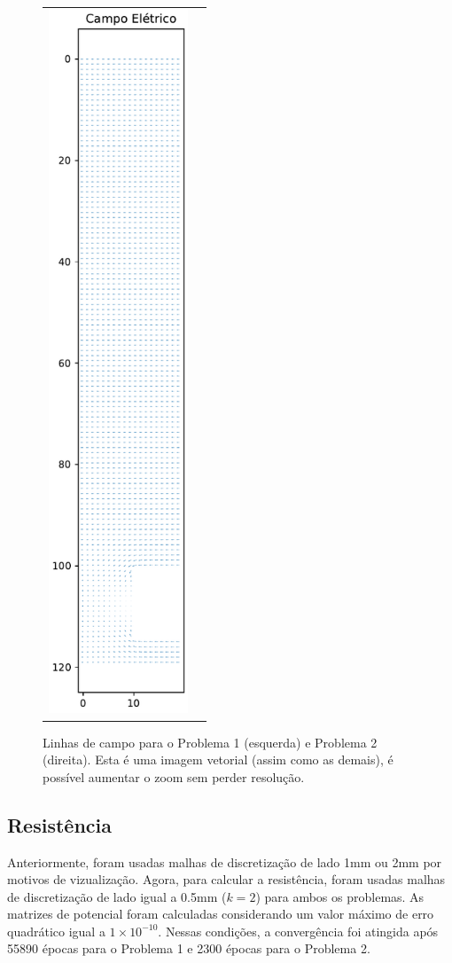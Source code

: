 \documentclass{aleph-revista}
\begin{document}
\begin{figure}[!ht]
\begin{tabular}{cc}
    \includegraphics[height=210mm]{p2_campo_eletrico}
  \end{tabular}
  \caption{Linhas de campo para o Problema 1 (esquerda) e Problema 2 (direita). Esta é uma imagem vetorial (assim como as demais), é possível aumentar o zoom sem perder resolução.}
  \label{fig:campo}
\end{figure}


\newpage
\subsection{Resistência}

Anteriormente, foram usadas malhas de discretização de lado 1mm ou 2mm por motivos de vizualização. Agora, para calcular a resistência, foram usadas malhas de discretização de lado igual a 0.5mm ($k=2$) para ambos os problemas. As matrizes de potencial foram calculadas considerando um valor máximo de erro quadrático igual a $1 \times 10^{-10}$. Nessas condições, a convergência foi atingida após 55890 épocas para o Problema 1 e 2300 épocas para o Problema 2.
\end{document}
